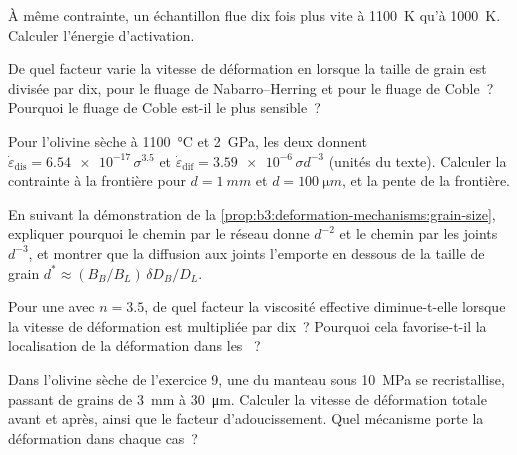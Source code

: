 \begin{exercise}[$\star\star$]\label{exo:b3:deformation-mechanisms:7}
À même contrainte, un échantillon flue dix fois plus vite à \qty{1100}{K} qu'à
\qty{1000}{K}. Calculer l'énergie d'activation.
\end{exercise}

\begin{exercise}[$\star\star$]\label{exo:b3:deformation-mechanisms:8}
De quel facteur varie la vitesse de déformation en  lorsque la
taille de grain est divisée par dix, pour le fluage de Nabarro--Herring et pour le fluage de Coble~? Pourquoi le
fluage de Coble est-il le plus sensible~?
\end{exercise}

\begin{exercise}[$\star\star$]\label{exo:b3:deformation-mechanisms:9}
Pour l'olivine sèche à \qty{1100}{\celsius} et \qty{2}{GPa}, les deux  donnent
$\dot\varepsilon_{\mathrm{dis}} = \num{6.54e-17}\,\sigma^{3.5}$ et
$\dot\varepsilon_{\mathrm{dif}} = \num{3.59e-6}\,\sigma d^{-3}$ (unités du
texte). Calculer la contrainte à la frontière pour $d = \qty{1}{mm}$ et $d =
\qty{100}{\micro m}$, et la pente de la frontière.
\end{exercise}

\begin{exercise}[$\star\star\star$]\label{exo:b3:deformation-mechanisms:10}
En suivant la démonstration de la \cref{prop:b3:deformation-mechanisms:grain-size},
expliquer pourquoi le chemin par le réseau donne $d^{-2}$ et le chemin par les joints $d^{-3}$, et
montrer que la diffusion aux joints l'emporte en dessous de la taille de grain $d^* \approx
(B_B/B_L)\,\delta D_B/D_L$.
\end{exercise}

\begin{exercise}[$\star\star\star$]\label{exo:b3:deformation-mechanisms:11}
Pour une  avec $n = 3.5$, de quel facteur la viscosité effective diminue-t-elle
lorsque la vitesse de déformation est multipliée par dix~? Pourquoi cela favorise-t-il la
localisation de la déformation dans les ~?
\end{exercise}

\begin{exercise}[$\star\star\star$]\label{exo:b3:deformation-mechanisms:12}
Dans l'olivine sèche de l'exercice 9, une  du manteau sous \qty{10}{MPa}
se recristallise, passant de grains de \qty{3}{mm} à \qty{30}{\micro m}. Calculer la
vitesse de déformation totale avant et après, ainsi que le facteur d'adoucissement. Quel
mécanisme porte la déformation dans chaque cas~?
\end{exercise}

